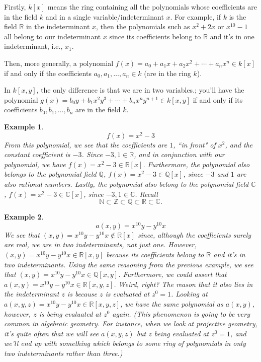 \documentclass[12pt,reqno]{amsart}
\theoremstyle{plain}
\newtheorem{ex}{Example}
\newcommand{\rr}{\mathbb R}
\newcommand{\cc}{\mathbb C}
\newcommand{\nn}{\mathbb N}
\newcommand{\zz}{\mathbb Z}
\newcommand{\qq}{\mathbb Q}
\begin{document}
 Firstly, $k[x]$ means the ring containing all the polynomials whose coefficients are in the field $k$ and in a single variable/indeterminant $x$. For example, if $k$ is the field $\rr$ in the indeterminant $x$, then the polynomials such as $x^2 + 2x$ or $x^{10} - 1$ all belong to our indeterminant $x$ since its coefficients belong to $\rr$ and it's in one indeterminant, i.e., $x_1$. 

Then, more generally, a polynomial $f(x) = a_0 + a_1 x + a_2 x^2 + \cdots + a_n x^n \in k[x]$ if and only if the coefficients $a_0, a_1, \ldots, a_n \in k$ (are in the ring $k$).

In $k[x,y]$, the only difference is that we are in two variables.; you'll have the polynomial $g(x) = b_0 y + b_1 x^2 y^3 + \cdots + b_n x^n y^{n+1} \in k[x, y]$ if and only if its coefficients $b_0, b_1, \ldots, b_n$ are in the field $k$.  

\begin{ex} $$f(x) = x^2 - 3$$ From this polynomial, we see that the coefficients are $1$, ``in front" of $x^2$, and the constant coefficient is $-3$. Since $ -3, 1 \in \rr$, and in conjunction with our polynomial, we have $f(x) = x^2 - 3 \in \rr[x]$. Furthermore, the polynomial also belongs to the polynomial field $\qq$,  $f(x) = x^2 - 3 \in \qq[x]$, since $-3$ and $1$ are also rational numbers. Lastly, the polynomial also belong to the polynomial field $\cc$, $f(x) = x^2 - 3 \in \cc[x]$, since $-3, 1 \in \cc$. Recall $$\nn \subset \zz \subset \qq \subset \rr \subset \cc .$$
\end{ex}

\begin{ex} $$a(x, y) = x^{10} y - y^{10} x $$
We see that $(x, y) = x^{10} y - y^{10} x \notin \rr[x]$ since, although the coefficients surely are real, we are in two indeterminants, not just one. However, $(x, y) = x^{10} y - y^{10} x \in \rr[x, y]$ because its coefficients belong to $\rr$ and it's in two indeterminants. Using the same reasoning from the previous example, we see that $(x, y) = x^{10} y - y^{10} x \in \qq[x,y]$. Furthermore, we could assert that $a(x, y) = x^{10}y-y^{10} x \in \rr[x, y, z ]$. Weird, right? The reason that it also lies in the indeterminant $z$ is because $z$ is evaluated at $z^0=1$. Looking at $a(x, y, z) = x^{10}y-y^{10} x \in \rr[x, y, z ]$, we have the same polynomial as $a(x, y)$, however, $z$ is being evaluated at $z^0$ again. (This phenomenon is going to be very common in algebraic geometry. For instance, when we look at projective geometry, it's quite often that we will see $a(x, y, z)$ but $z$ being evaluated at $z^0=1$, and we'll end up with something which belongs to some ring of polynomials in only two indeterminants rather than three.)
\end{ex}
\end{document}
